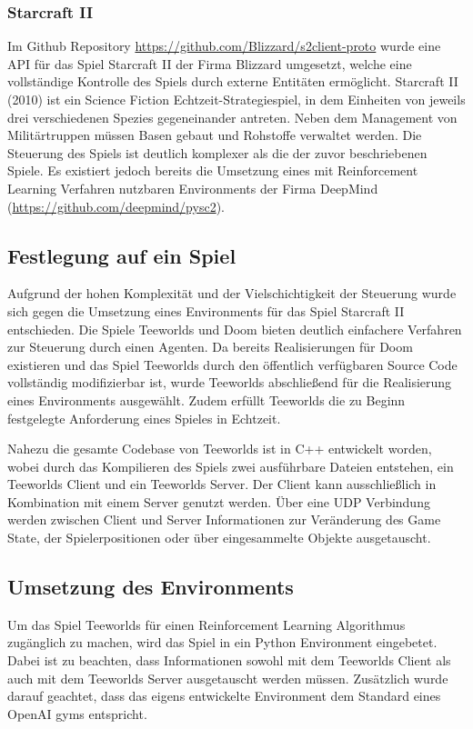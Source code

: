 \documentclass[11pt]{scrartcl}
\begin{document}
\subsubsection{Starcraft II}
Im Github Repository \url{https://github.com/Blizzard/s2client-proto} wurde eine API für das Spiel
Starcraft II der Firma Blizzard umgesetzt, welche eine vollständige Kontrolle des Spiels durch
externe Entitäten ermöglicht. Starcraft II (2010) ist ein Science Fiction Echtzeit-Strategiespiel,
in dem Einheiten von jeweils drei verschiedenen Spezies gegeneinander antreten. Neben dem
Management von Militärtruppen müssen Basen gebaut und Rohstoffe verwaltet werden. Die Steuerung
des Spiels ist deutlich komplexer als die der zuvor beschriebenen Spiele. Es existiert jedoch
bereits die Umsetzung eines mit Reinforcement Learning Verfahren nutzbaren Environments der Firma
DeepMind (\url{https://github.com/deepmind/pysc2}). 

\subsection{Festlegung auf ein Spiel}
Aufgrund der hohen Komplexität und der Vielschichtigkeit der Steuerung wurde sich gegen die Umsetzung
eines Environments für das Spiel Starcraft II entschieden. Die Spiele Teeworlds und Doom bieten
deutlich einfachere Verfahren zur Steuerung durch einen Agenten. Da bereits Realisierungen für Doom
existieren und das Spiel Teeworlds durch den öffentlich verfügbaren Source Code vollständig modifizierbar
ist, wurde Teeworlds abschließend für die Realisierung eines Environments ausgewählt. Zudem erfüllt
Teeworlds die zu Beginn festgelegte Anforderung eines Spieles in Echtzeit.

Nahezu die gesamte Codebase von Teeworlds ist in C++ entwickelt worden, wobei durch das Kompilieren
des Spiels zwei ausführbare Dateien entstehen, ein Teeworlds Client und ein Teeworlds Server. Der
Client kann ausschließlich in Kombination mit einem Server genutzt werden. Über eine UDP Verbindung
werden zwischen Client und Server Informationen zur Veränderung des Game State, der Spielerpositionen
oder über eingesammelte Objekte ausgetauscht.

\subsection{Umsetzung des Environments}
Um das Spiel Teeworlds für einen Reinforcement Learning Algorithmus zugänglich zu machen,
wird das Spiel in ein Python Environment eingebetet. Dabei ist zu beachten, dass
Informationen sowohl mit dem Teeworlds Client als auch mit dem Teeworlds Server ausgetauscht
werden müssen. Zusätzlich wurde darauf geachtet, dass das eigens entwickelte Environment dem
Standard eines OpenAI gyms entspricht.
\end{document}
